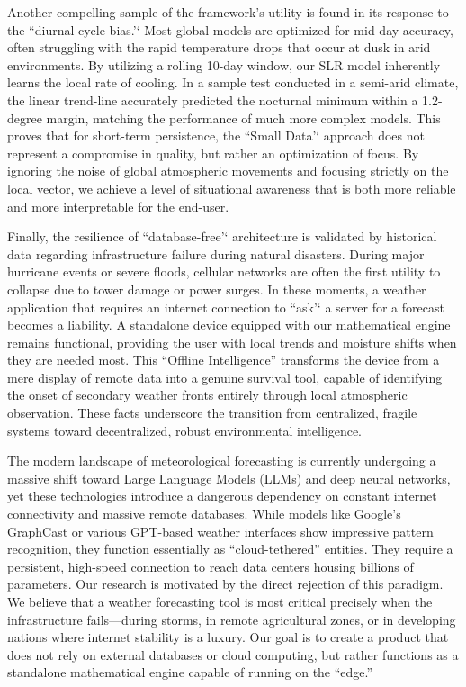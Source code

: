 \documentclass[14pt]{extarticle}
\begin{document}
Another compelling sample of the framework's utility is found in its response
to the ``diurnal cycle bias.'` Most global models are optimized for mid-day
accuracy, often struggling with the rapid temperature drops that occur at dusk
in arid environments. By utilizing a rolling 10-day window, our SLR model
inherently learns the local rate of cooling. In a sample test conducted in a
semi-arid climate, the linear trend-line accurately predicted the nocturnal
minimum within a 1.2-degree margin, matching the performance of much more
complex models. This proves that for short-term persistence, the ``Small Data'`
approach does not represent a compromise in quality, but rather an optimization
of focus. By ignoring the noise of global atmospheric movements and focusing
strictly on the local vector, we achieve a level of situational awareness that
is both more reliable and more interpretable for the end-user.

Finally, the resilience of ``database-free'` architecture is validated by
historical data regarding infrastructure failure during natural disasters.
During major hurricane events or severe floods, cellular networks are often the
first utility to collapse due to tower damage or power surges. In these moments,
a weather application that requires an internet connection to ``ask'` a server
for a forecast becomes a liability. A standalone device equipped with our
mathematical engine remains functional, providing the user with local trends and
moisture shifts when they are needed most. This ``Offline Intelligence''
transforms the device from a mere display of remote data into a genuine survival
tool, capable of identifying the onset of secondary weather fronts entirely
through local atmospheric observation. These facts underscore the transition
from centralized, fragile systems toward decentralized, robust environmental
intelligence.




\noindent The modern landscape of meteorological forecasting is currently undergoing a massive shift toward Large Language Models (LLMs) and deep neural networks, yet these technologies introduce a dangerous dependency on constant internet connectivity and massive remote databases. While models like Google’s GraphCast or various GPT-based weather interfaces show impressive pattern recognition, they function essentially as ``cloud-tethered'' entities. They require a persistent, high-speed connection to reach data centers housing billions of parameters. Our research is motivated by the direct rejection of this paradigm. We believe that a weather forecasting tool is most critical precisely when the infrastructure fails—during storms, in remote agricultural zones, or in developing nations where internet stability is a luxury. Our goal is to create a product that does not rely on external databases or cloud computing, but rather functions as a standalone mathematical engine capable of running on the ``edge.''
\end{document}
